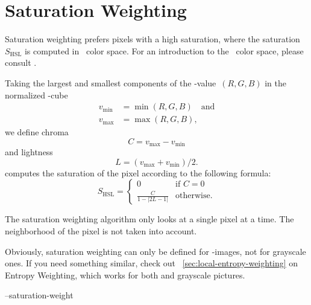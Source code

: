

\section[Saturation Weighting]{\label{sec:saturation-weighting}%
  Saturation Weighting}

%
%
Saturation weighting prefers pixels with a high saturation, where the
saturation~$S_{\mathrm{HSL}}$ is computed in ~color space.  For an introduction to
the ~color space, please consult .

Taking the largest and smallest components of the -value~$(R, G, B)$ in the
normalized -cube
\begin{align*}
  v_{\mathrm{min}} &= \min(R, G, B) \quad \mbox{and} \\
  v_{\mathrm{max}} &= \max(R, G, B),
\end{align*}
we define chroma
\[
  C = v_{\mathrm{max}} - v_{\mathrm{min}}
\]
and lightness
\[
  L = (v_{\mathrm{max}} + v_{\mathrm{min}}) / 2.
\]
\noindent \App{} computes the saturation of the pixel according to the following formula:
\begin{equation}\label{equ:saturationweight:hsl}
  S_{\mathrm{HSL}} =
  \left\{\begin{array}{cl}
  0                       & \mbox{if } C = 0 \\
  \frac{C}{1 - |2L - 1|}  & \mbox{otherwise.}
  \end{array}\right.
\end{equation}

The saturation weighting algorithm only looks at a single pixel at a time.  The neighborhood of
the pixel is not taken into account.

%
Obviously, saturation weighting can only be defined for -images, not for grayscale
ones.  If you need something similar, check out \sectionName~\ref{sec:local-entropy-weighting}
on Entropy Weighting, which works for both  and grayscale pictures.

\begin{optionsummary}
\item[--saturation-weight] \sectionName~
\end{optionsummary}


